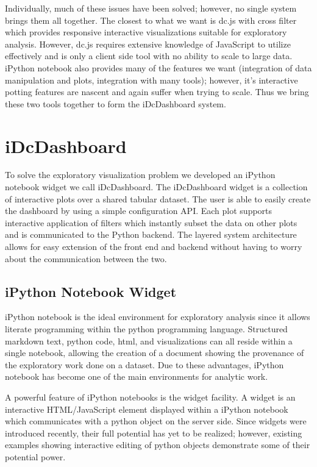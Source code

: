 \documentclass[letter,twocolumn]{article}
\begin{document}
Individually, much of these issues have been solved; however, no single system brings them all together.
The closest to what we want is dc.js with cross filter which provides responsive interactive visualizations suitable for exploratory analysis.
However, dc.js requires extensive knowledge of JavaScript to utilize effectively and is only a client side tool with no ability to scale to large data.
iPython notebook also provides many of the features we want (integration of data manipulation and plots, integration with many tools); however, it's interactive potting features are nascent and again suffer when trying to scale.
Thus we bring these two tools together to form the iDcDashboard system.

\section{iDcDashboard}%

To solve the exploratory visualization problem we developed an iPython notebook widget we call iDcDashboard.
The iDcDashboard widget is a collection of interactive plots over a shared tabular dataset.
The user is able to easily create the dashboard by using a simple configuration API.
Each plot supports interactive application of filters which instantly subset the data on other plots and is communicated to the Python backend.
The layered system architecture allows for easy extension of the front end and backend without having to worry about the communication between the two.

\subsection{iPython Notebook Widget}

iPython notebook\cite{perez2013open} is the ideal environment for exploratory analysis since it allows literate programming within the python programming language.
Structured markdown text, python code, html, and visualizations can all reside within a single notebook, allowing the creation of a document showing the provenance of the exploratory work done on a dataset. 
Due to these advantages, iPython notebook has become one of the main environments for analytic work.

A powerful feature of iPython notebooks is the widget facility.
A widget is an interactive HTML/JavaScript element displayed within a iPython notebook which communicates with a python object on the server side.
Since widgets were introduced recently, their full potential has yet to be realized; however, existing examples showing interactive editing of python objects demonstrate some of their potential power.
\end{document}

